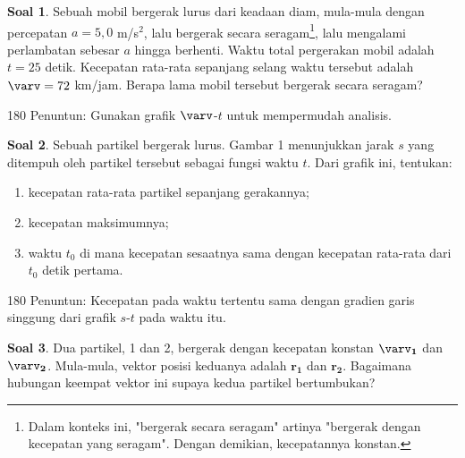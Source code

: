 \documentclass[a4paper, 11.5pt]{article}
\theoremstyle{definition}
\newtheorem{soal}{Soal}
\begin{document}
\begin{soal}
	Sebuah mobil bergerak lurus dari keadaan diam, mula-mula dengan percepatan $a = 5{,}0$ m/s$^2$, lalu bergerak secara seragam\footnote{Dalam konteks ini, "bergerak secara seragam" artinya "bergerak dengan kecepatan yang seragam". Dengan demikian, kecepatannya konstan.}, lalu mengalami perlambatan sebesar $a$ hingga berhenti. Waktu total pergerakan mobil adalah $t = 25$ detik. Kecepatan rata-rata sepanjang selang waktu tersebut adalah $\varv = 72$ km/jam. Berapa lama mobil tersebut bergerak secara seragam?
\end{soal}

\begin{flushright}
	\begin{rotate}{180}
		\color{lightgray}
		Penuntun: Gunakan grafik $\varv$-$t$ untuk mempermudah analisis.
	\end{rotate}
\end{flushright}

\begin{soal}
	Sebuah partikel bergerak lurus. Gambar 1 menunjukkan jarak $s$ yang ditempuh oleh partikel tersebut sebagai fungsi waktu $t$. Dari grafik ini, tentukan:
	
	\begin{enumerate}[label=(\alph*)]
		\item kecepatan rata-rata partikel sepanjang gerakannya;
		\item kecepatan maksimumnya;
		\item waktu $t_0$ di mana kecepatan sesaatnya sama dengan kecepatan rata-rata dari $t_0$ detik pertama.
	\end{enumerate}

\end{soal}

\begin{flushright}
	\begin{rotate}{180}
		\color{lightgray}
		Penuntun: Kecepatan pada waktu tertentu sama dengan gradien garis singgung dari grafik $s$-$t$ pada waktu itu.
	\end{rotate}
\end{flushright}

\begin{soal}
	Dua partikel, 1 dan 2, bergerak dengan kecepatan konstan $\boldsymbol{\varv_1}$ dan $\boldsymbol{\varv_2}$. Mula-mula, vektor posisi keduanya adalah $\boldsymbol{r_1}$ dan $\boldsymbol{r_2}$. Bagaimana hubungan keempat vektor ini supaya kedua partikel bertumbukan?
\end{soal}
\end{document}
